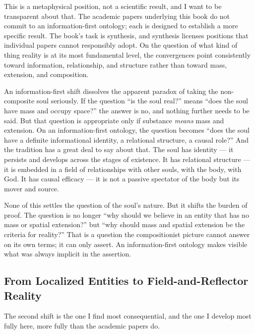 This is a metaphysical position, not a scientific result, and I want to be
transparent about that. The academic papers underlying this book do not commit
to an information-first ontology; each is designed to establish a more specific
result. The book's task is synthesis, and synthesis licenses positions that
individual papers cannot responsibly adopt. On the question of what kind of
thing reality is at its most fundamental level, the convergences point
consistently toward information, relationship, and structure rather than toward
mass, extension, and composition.

An information-first shift dissolves the apparent paradox of taking the
non-composite soul seriously. If the question
``is the soul real?'' means ``does the soul have mass and occupy space?'' the
answer is no, and nothing further needs to be said. But that question is
appropriate only if substance \emph{means} mass and extension. On an
information-first ontology, the question becomes ``does the soul have a
definite informational identity, a relational structure, a causal role?'' And
the \bahai tradition has a great deal to
say about that. The soul has identity --- it persists and develops across the
stages of existence. It has relational structure --- it is embedded in a field
of relationships with other souls, with the body, with God. It has causal
efficacy --- it is not a passive spectator of the body but its mover and
source.

None of this settles the question of the soul's nature. But it shifts the
burden of proof. The question is no longer ``why should we believe in an entity
that has no mass or spatial extension?'' but ``why should mass and spatial
extension be the criteria for reality?'' That is a question the compositionist
picture cannot answer on its own terms; it can only assert. An information-first
ontology makes visible what was always implicit in the assertion.


\subsection{From Localized Entities to Field-and-Reflector Reality}
\label{subsec:field-reflector}

The second shift is the one I find most consequential, and the one I develop
most fully here, more fully than the academic papers do.

